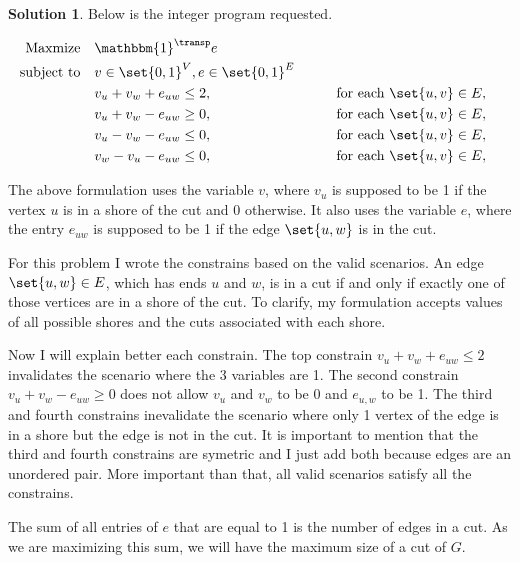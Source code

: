 \documentclass[11pt,leqno,final]{amsart}
\theoremstyle{definition}
\newtheorem{solution}{Solution}
\begin{document}
\begin{solution}
  Below is the integer program requested.  

  \begin{alignat*}{3}
    \text{Maxmize} \quad
    & \mathbbm{1}^{\transp}e &
    \\[0pt]
    \text{subject to}\quad
    & v \in \set{0,1}^{V}, e \in \set{0,1}^{E}&&
    \\[0pt]
    & v_u + v_w + e_{uw} \leq 2, &&
    \qquad \text{for each } \set{u,v} \in E,
    \\[0pt]
    & v_u + v_w - e_{uw} \geq 0, &&
    \qquad \text{for each } \set{u,v} \in E,
    \\[0pt]
    & v_u - v_w - e_{uw} \leq 0, &&
    \qquad \text{for each } \set{u,v} \in E,
    \\[0pt]
    & v_w - v_u - e_{uw} \leq 0, &&
    \qquad \text{for each } \set{u,v} \in E,
  \end{alignat*}
  
  The above formulation uses the variable $v$, where $v_u$ is supposed to be 1 if the vertex $u$ is in a shore of the cut and 0 otherwise. It also uses the variable $e$, where the entry $e_{uw}$ is supposed to be 1 if the edge $\set{u,w}$ is in the cut. 
  
  For this problem I wrote the constrains based on the valid scenarios. An edge $\set{u,w} \in E$, which has ends $u$ and $w$, is in a cut if and only if exactly one of those vertices are in a shore of the cut. To clarify, my formulation accepts values of all possible shores and the cuts associated with each shore.
  
  Now I will explain better each constrain. The top constrain $v_u + v_w + e_{uw} \leq 2$ invalidates the scenario where the 3 variables are 1. The second constrain $v_u + v_w - e_{uw} \geq 0$ does not allow $v_u$ and $v_w$ to be 0 and $e_{u,w}$ to be 1. The third and fourth constrains inevalidate the scenario where only 1 vertex of the edge is in a shore but the edge is not in the cut. It is important to mention that the third and fourth constrains are symetric and I just add both because edges are an unordered pair. More important than that, all valid scenarios satisfy all the constrains.
  
  The sum of all entries of $e$ that are equal to 1 is the number of edges in a cut. As we are maximizing this sum, we will have the maximum size of a cut of $G$.
\end{solution}
\end{document}
